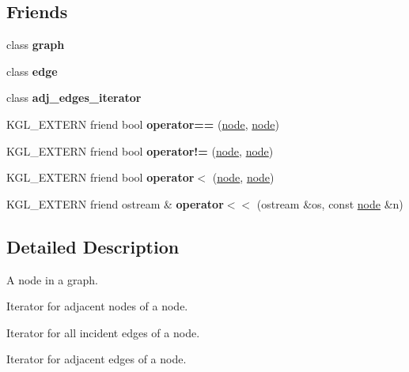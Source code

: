 \subsection*{Friends}
\begin{DoxyCompactItemize}
\item 
\mbox{\label{classnode_ab8b0dbc1b36724e5e4635ac651c218cb}} 
class {\bfseries graph}
\item 
\mbox{\label{classnode_a534891c80172dde5e777a3908cc6e2f1}} 
class {\bfseries edge}
\item 
\mbox{\label{classnode_abdd49248203010f2d5432dfef22d017a}} 
class {\bfseries adj\+\_\+edges\+\_\+iterator}
\item 
\mbox{\label{classnode_a19ea521fd5b3813e179997758f1109f0}} 
K\+G\+L\+\_\+\+E\+X\+T\+E\+RN friend bool {\bfseries operator==} (\mbox{\hyperlink{classnode}{node}}, \mbox{\hyperlink{classnode}{node}})
\item 
\mbox{\label{classnode_ac95f53a475a3895dff3f9495ab87bf75}} 
K\+G\+L\+\_\+\+E\+X\+T\+E\+RN friend bool {\bfseries operator!=} (\mbox{\hyperlink{classnode}{node}}, \mbox{\hyperlink{classnode}{node}})
\item 
\mbox{\label{classnode_a01896810a81fff14def134f6e9638f99}} 
K\+G\+L\+\_\+\+E\+X\+T\+E\+RN friend bool {\bfseries operator$<$} (\mbox{\hyperlink{classnode}{node}}, \mbox{\hyperlink{classnode}{node}})
\item 
\mbox{\label{classnode_a6252a93f7623a3554f5b877874639f4e}} 
K\+G\+L\+\_\+\+E\+X\+T\+E\+RN friend ostream \& {\bfseries operator$<$$<$} (ostream \&os, const \mbox{\hyperlink{classnode}{node}} \&n)
\end{DoxyCompactItemize}


\subsection{Detailed Description}
A node in a graph. 

Iterator for adjacent nodes of a node.

Iterator for all incident edges of a node.

Iterator for adjacent edges of a node. 


